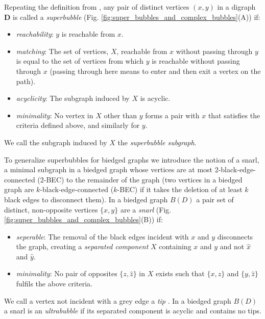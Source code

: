 \documentclass[11pt]{ucthesis}
\begin{document}
Repeating the definition from \cite{Onodera:2013fo}, any pair of distinct vertices $(x, y)$ in a digraph $\textbf{D}$ is called a \emph{superbubble} (Fig. \ref{fig:super_bubbles_and_complex_bubbles}(A)) if:
\begin{itemize}
\item \emph{reachability}: $y$ is reachable from $x$.
\item \emph{matching}: The set of vertices, $X$, reachable from $x$ without passing through $y$ is equal to the set of vertices from which $y$ is reachable without passing through $x$ (passing through here means to enter and then exit a vertex on the path). 
\item \emph{acyclicity}: The subgraph induced by $X$ is acyclic.
\item \emph{minimality}: No vertex in $X$ other than $y$ forms a pair with $x$ that satisfies the criteria defined above, and similarly for $y$.
\end{itemize}

We call the subgraph induced by $X$ the \emph{superbubble subgraph}.


To generalize superbubbles for biedged graphs we introduce the notion of a snarl, a minimal subgraph in a biedged graph whose vertices are at most 2-black-edge-connected (2-BEC) to the remainder of the graph (two vertices in a biedged graph are $k$-black-edge-connected ($k$-BEC) if it takes the deletion of at least $k$ black edges to disconnect them). In a biedged graph $B(D)$ a pair set of distinct, non-opposite vertices $\{ x, y \}$ are a \emph{snarl} (Fig. \ref{fig:super_bubbles_and_complex_bubbles}(B)) if:
\begin{itemize}
\item \emph{seperable}: The removal of the black edges incident with $x$ and $y$ disconnects the graph, creating a \emph{separated component} $X$ containing $x$ and $y$ and not $\hat{x}$ and $\hat{y}$.
\item \emph{minimality}: No pair of opposites $\{ z, \hat{z} \}$ in $X$ exists such that $\{ x, z \}$ and $\{ y, \hat{z} \}$ fulfils the above criteria.
\end{itemize}


We call a vertex not incident with a grey edge a \emph{tip} \cite{Zerbino:2008bm}. In a biedged graph $B(D)$ a snarl is an \emph{ultrabubble} if its separated component is acyclic and contains no tips.
\end{document}
